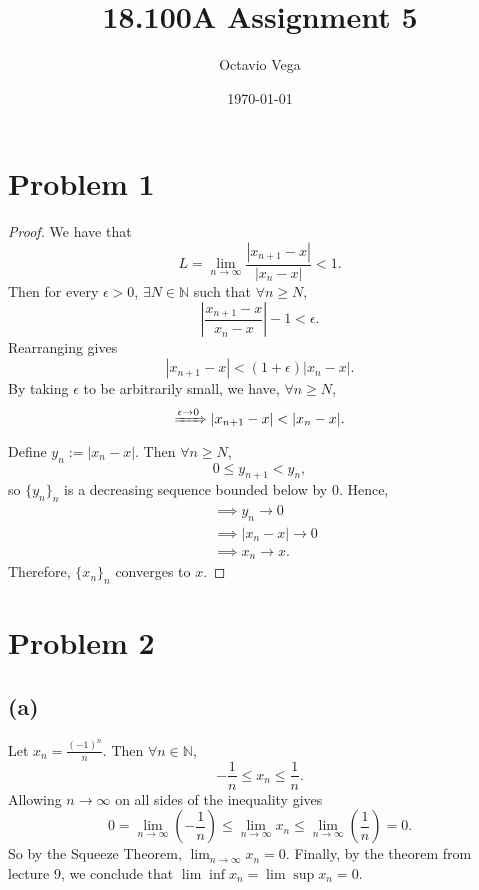 \documentclass{article}
\title{18.100A Assignment 5}
\author{Octavio Vega}
\date\today
\begin{document}
\maketitle

\section*{Problem 1}
\begin{proof}
	We have that
	\begin{equation}
		L = \lim\limits_{n\to\infty} \frac{|x_{n+1}-x|}{|x_n-x|} < 1.
	\end{equation}
	Then for every $\epsilon > 0$, $\exists N \in \mathbb{N}$ such that $\forall n \geq N$, 
	\begin{equation}
		\left|\frac{x_{n+1}-x}{x_n - x}\right| - 1 < \epsilon.
	\end{equation}
	Rearranging gives
	\begin{equation}
		|x_{n+1}-x| < (1+\epsilon)|x_n - x|.
	\end{equation}
	By taking $\epsilon$ to be arbitrarily small, we have, $\forall n \geq N$,
	\begin{equation}
		\xRightarrow{\epsilon \to 0} |x_{n+1}-x| < |x_n-x|.
	\end{equation}
	Define $y_n := |x_n - x|$. Then $\forall n \geq N$, 
	\begin{equation}
		0 \leq y_{n+1} < y_n,
	\end{equation}
	so $\{y_n\}_n$ is a decreasing sequence bounded below by $0$. Hence,
	\begin{align}
		&\implies y_n \rightarrow 0 \\
		&\implies |x_n - x| \rightarrow 0 \\
		&\implies x_n \rightarrow x.
	\end{align}
	Therefore, $\{x_n\}_n$ converges to $x$.
\end{proof}
\section*{Problem 2}
\subsection*{(a)}
Let $x_n = \frac{(-1)^n}{n}$. Then $\forall n \in \mathbb{N}$,
\begin{equation}
	-\frac{1}{n} \leq x_n \leq \frac{1}{n}.
\end{equation}
Allowing $n \to \infty$ on all sides of the inequality gives
\begin{equation}
	0=\lim\limits_{n\to\infty} \left(-\frac{1}{n}\right) \leq \lim_{n \to \infty} x_n \leq \lim_{n\to\infty} \left(\frac{1}{n}\right)=0.
\end{equation}
So by the Squeeze Theorem, $\lim_{n\to\infty} x_n = 0$. Finally, by the theorem from lecture 9, we conclude that $\lim\inf{x_n}=\lim\sup{x_n}=0$.
\end{document}
